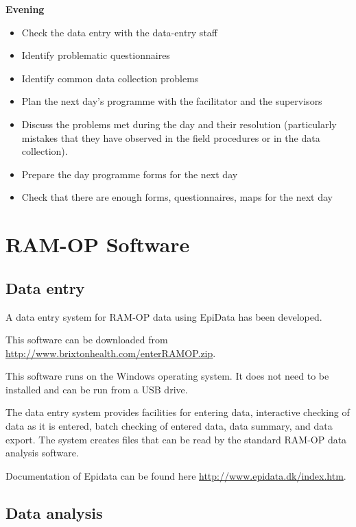 \documentclass[12pt,a4paper]{book}
\providecommand{\tightlist}{%
  \setlength{\itemsep}{0pt}\setlength{\parskip}{0pt}}
\begin{document}
\textbf{Evening}

\begin{itemize}
\tightlist
\item
  Check the data entry with the data-entry staff
\item
  Identify problematic questionnaires
\item
  Identify common data collection problems
\item
  Plan the next day's programme with the facilitator and the supervisors
\item
  Discuss the problems met during the day and their resolution (particularly mistakes that they have observed in the field procedures or in the data collection).
\item
  Prepare the day programme forms for the next day
\item
  Check that there are enough forms, questionnaires, maps for the next day
\end{itemize}

\hypertarget{software}{%
\chapter{RAM-OP Software}\label{software}}

\hypertarget{data-entry}{%
\section{Data entry}\label{data-entry}}

A data entry system for RAM-OP data using EpiData has been developed.

This software can be downloaded from \url{http://www.brixtonhealth.com/enterRAMOP.zip}.

This software runs on the Windows operating system. It does not need to be installed and can be run from a USB drive.

The data entry system provides facilities for entering data, interactive checking of data as it is entered, batch checking of entered data, data summary, and data export. The system creates files that can be read by the standard RAM-OP data analysis software.

Documentation of Epidata can be found here \url{http://www.epidata.dk/index.htm}.

\hypertarget{data-analysis}{%
\section{Data analysis}\label{data-analysis}}
\end{document}
